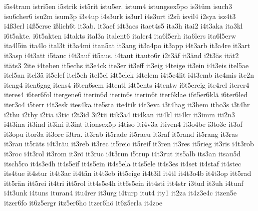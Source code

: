 {    i5s4tram
    istri5en
    i5strik
    ist5rit
    istu5er.
    istum4
    istungsex5po
    is3tüm
    isuch3
    isu6cher6
    isu2m
    isum3p
    i3s4up
    i4s3urk
    is3url
    i4s3urt
    i2sü
    isvil4
    i2sya
    isz4t3
    i4ß3erl
    i4ß5erse
    ißlich6t
    it3ab.
    it3aef
    i4t3aes
    itaet4s5
    ita3h
    itai2
    i4t3aka
    ita3kl
    i6t5akte.
    i6t5akten
    i4takts
    ital3a
    italent6
    italer4
    ita6l5erh
    ita6lers
    ita6l5erw
    ita4l5in
    ita4lo
    ital3t
    it3a4mi
    itan5at
    it3ang
    it3a4po
    it3app
    i4t3arb
    it3a4re
    it3art
    it3asp
    i4t3att
    i5tauc
    i4t3auf
    it5aus.
    i4taut
    itauto6r
    i2t3äf
    it3änd
    i2t3äs
    ität2
    itäts3
    2ite
    i4teben
    it5echs
    it3e4ck
    ite3er
    it3eff
    it3eig
    i4teige
    it3ein
    i4t3eis
    itel5ae
    itel5an
    itel3ä
    it5elef
    itel5eh
    itel5ei
    i4t5elek
    i4telem
    i4t5e4lit
    i4t3emb
    ite4mis
    ite2n
    iteng4
    iten6gag
    itens4
    i6ten6sem
    i4tentl
    i4t5ents
    i4tentw
    i6t5ereig
    ite4rel
    iterer4
    iteres4
    i6ter6fol
    itergene6
    iterin6d
    iterin6s
    iterin6t
    iter6klae
    i6t5er6klä
    i6ter6led
    iter3o4
    i5terr
    i4t3esk
    ites4ka
    ite5sta
    ite4tik
    i4t3eva
    i3t4hag
    it3hem
    itho3s
    i3t4hr
    i2thu
    i2thy
    i2tia
    i3tic
    i2t3id
    3i2tii
    itik3a4
    iti4kan
    iti4kl
    iti4kr
    it3imm
    iti2n3
    i4t3ina
    it3ind
    it3ini
    it3int
    itionsex5p
    i4tiso
    iti4v3a
    itiven4
    it3o4be
    i3to3c
    it3of
    it3opu
    itor3a
    it3orc
    i3tra.
    it3rab
    it5rade
    it5raeu
    it3raf
    it5rand
    it5rang
    it3ras
    it3rau
    it5räts
    i4t3räu
    it3reb
    it3rec
    it5reic
    it5reif
    it3ren
    it3res
    it5rieg
    it3ris
    i4t3rob
    it3roc
    i4t3rol
    it3rom
    it3rö
    it3ruc
    i4t3run
    i5trup
    i4t3rut
    its5alb
    its3an
    itsau5d
    itsch5ro
    it4s3e4h
    it4s5eif
    it4s5ein
    it4s5ela
    it4s5ele
    it4s3es
    it4set
    it4staf
    it4stec
    its4tue
    it4stur
    it4t3ac
    it4tän
    it4t3eb
    itt5eige
    it4t3il
    it4tl
    it4t3o4b
    it4t3op
    itt5rad
    itt5rän
    itt5rei
    it4tri
    itt5rol
    itt4s5e4h
    itt6s5ein
    itt4sti
    itt4str
    i3tud
    it3uh
    i4tunf
    i4t3unk
    i4tuns
    ituran4
    itu4rer
    it3urg
    i4turp
    itut4
    ity1
    it2za
    it4z3e4c
    itzen5e
    itzer6fo
    it6z5ergr
    itz5er6ho
    itzer6hö
    it6z5erla
    it4zoe
}
